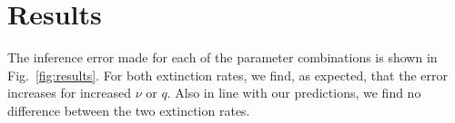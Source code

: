 \section{Results}

The inference error made for each of the parameter combinations
is shown in Fig.~\ref{fig:results}. For both extinction rates,
we find, as expected, that the error increases for increased $\nu$
or $q$. Also in line with our predictions, we find no difference
between the two extinction rates.

